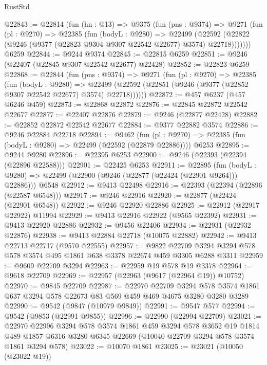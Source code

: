 \begin{lexlean}{RustStd}
\begin{coremodule}
@22843 := @22814
    (fun (hn : @13) =>
    @9375
      (fun (pns : @9374) =>
      @9271
        (fun (pl : @9270) =>
        @22385
          (fun (bodyL : @9280) =>
          @22499
            (@22592 (@22822 (@9246 (@9377 (@22823 @9304 @9307 @22542 @22677) @3574) @22718)))))))
    @6259
@22844 := @9244 @9374
@22845 := @22815 @6259
@22851 := @9246 (@22407 (@22845 @9307 @22542 @22677) @22428)
@22852 := @22823 @6259
@22868 := @22844
    (fun (pns : @9374) =>
    @9271
      (fun (pl : @9270) =>
      @22385
        (fun (bodyL : @9280) =>
        @22499 (@22592 (@22851 (@9246 (@9377 (@22852 @9307 @22542 @22677) @3574) @22718))))))
@22872 := @457 @6237 (@457 @6246 @459)
@22873 := @22868 @22872
@22876 := @22845 @22872 @22542 @22677
@22877 := @22407 @22876
@22879 := @9246 (@22877 @22428)
@22882 := @22852 @22872 @22542 @22677
@22884 := @9377 @22882 @3574
@22886 := @9246 @22884 @22718
@22894 := @9462
    (fun (pl : @9270) => @22385 (fun (bodyL : @9280) => @22499 (@22592 (@22879 @22886))))
    @6253
@22895 := @9244 @9280
@22896 := @22395 @6253
@22900 := @9246 (@22393 (@22394 (@22896 @22588)))
@22901 := @22425 @6253
@22911 := @22895
    (fun (bodyL : @9280) => @22499 (@22900 (@9246 (@22877 (@22424 (@22901 @9264))) @22886)))
    @6548
@22912 := @9413 @22498
@22916 := @22393 (@22394 (@22896 (@22587 @6548)))
@22917 := @9246 @22916
@22920 := @22877 (@22424 (@22901 @6548))
@22922 := @9246 @22920 @22886
@22925 := @22912 (@22917 @22922) @11994
@22929 := @9413 @22916 @22922 (@9565 @22392)
@22931 := @9413 @22920 @22886
@22932 := @9456 @22406
@22934 := @22931 (@22932 @22876)
@22938 := @9413 @22884 @22718 (@10075 @22882)
@22942 := @9413 @22713 @22717 (@9570 @22555)
@22957 := @9822
    @22709
    @3294
    @3294
    @578
    @578
    @3574
    @495
    @1861
    @638
    @3378
    @22674
    @459
    @3305
    @6288
    @3311
@22959 := @9609 @22709 @3294
@22963 := @22959 @19 @578 @19 @3378
@22964 := @9618 @22709
@22969 := @22957 (@22963 (@9617 (@22964 @19)) @10752)
@22970 := @9845 @22709
@22987 := @22970
    @22709
    @3294
    @578
    @3574
    @1861
    @637
    @3294
    @578
    @22673
    @83
    @569
    @459
    @469
    @4675
    @3280
    @3280
    @3289
@22990 := @9542 (@9847 (@10979 @9849))
@22991 := @9547 @577
@22994 := @9542 (@9853 (@22991 @9855))
@22996 := @22990 (@22994 @22709)
@23021 := @22970
    @22996
    @3294
    @578
    @3574
    @1861
    @459
    @3294
    @578
    @3652
    @19
    @1814
    @489
    @1857
    @6316
    @3280
    @6345
    @22669
    (@10040 @22709 @3294 @578 @3574 @1861 @3294 @578)
@23022 := @10070 @1861
@23025 := @23021 (@10050 (@23022 @19))

\end{coremodule}
\end{lexlean}
